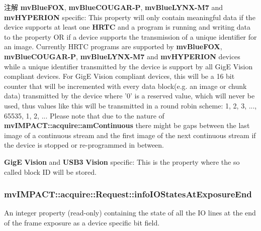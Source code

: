\begin{DoxyNote}{注解}
{\bfseries mv\+Blue\+F\+O\+X}, {\bfseries mv\+Blue\+C\+O\+U\+G\+A\+R-\/\+P}, {\bfseries mv\+Blue\+L\+Y\+N\+X-\/\+M7} and {\bfseries mv\+H\+Y\+P\+E\+R\+I\+O\+N} specific\+: This property will only contain meaningful data if the device supports at least one {\bfseries H\+R\+T\+C} and a program is running and writing data to the property O\+R if a device supports the transmission of a unique identifier for an image. Currently H\+R\+T\+C programs are supported by {\bfseries mv\+Blue\+F\+O\+X}, {\bfseries mv\+Blue\+C\+O\+U\+G\+A\+R-\/\+P}, {\bfseries mv\+Blue\+L\+Y\+N\+X-\/\+M7} and {\bfseries mv\+H\+Y\+P\+E\+R\+I\+O\+N} devices while a unique identifier transmitted by the device is support by all Gig\+E Vision compliant devices. For Gig\+E Vision compliant devices, this will be a 16 bit counter that will be incremented with every data block(e.\+g. an image or chunk data) transmitted by the device where '0' is a reserved value, which will never be used, thus values like this will be transmitted in a round robin scheme\+: 1, 2, 3, ..., 65535, 1, 2, ... Please note that due to the nature of {\bfseries mv\+I\+M\+P\+A\+C\+T\+::acquire\+::am\+Continuous} there might be gaps between the last image of a continuous stream and the first image of the next continuous stream if the device is stopped or re-\/programmed in between.

{\bfseries Gig\+E} {\bfseries Vision} and {\bfseries U\+S\+B3} {\bfseries Vision} specific\+: This is the property where the so called block I\+D will be stored. 
\end{DoxyNote}
\hypertarget{classmv_i_m_p_a_c_t_1_1acquire_1_1_request_a39f42fe7bd18748985f3d0bca0c2ad01}{
\subsubsection[{info\+I\+O\+States\+At\+Exposure\+End}]{ mv\+I\+M\+P\+A\+C\+T\+::acquire\+::\+Request\+::info\+I\+O\+States\+At\+Exposure\+End}}\label{classmv_i_m_p_a_c_t_1_1acquire_1_1_request_a39f42fe7bd18748985f3d0bca0c2ad01}


An integer property {\bfseries }(read-\/only) containing the state of all the I\+O lines at the end of the frame exposure as a device specific bit field. 

